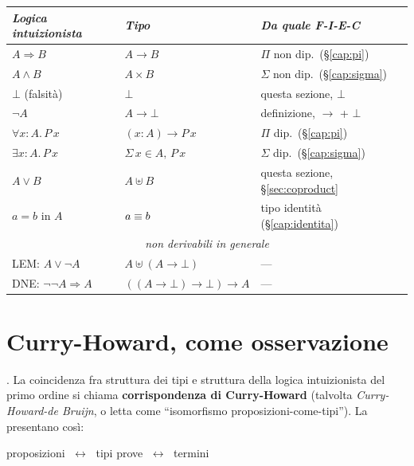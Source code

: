 \begin{center}
\renewcommand{\arraystretch}{1.2}
\begin{tabular}{lll}
\toprule
\textit{Logica intuizionista} & \textit{Tipo} & \textit{Da quale F-I-E-C} \\
\midrule
$A \Rightarrow B$       & $A \to B$              & $\Pi$ non dip.\ (\S\ref{cap:pi}) \\
$A \wedge B$            & $A \times B$           & $\Sigma$ non dip.\ (\S\ref{cap:sigma}) \\
$\bot$ (falsit\`a)      & $\bot$                 & questa sezione, $\bot$ \\
$\neg A$                & $A \to \bot$           & definizione, $\to$ + $\bot$ \\
$\forall x : A.\,P\,x$  & $(x : A) \to P\,x$     & $\Pi$ dip.\ (\S\ref{cap:pi}) \\
$\exists x : A.\,P\,x$  & $\Sigma\,x \in A,\,P\,x$ & $\Sigma$ dip.\ (\S\ref{cap:sigma}) \\
$A \vee B$              & $A \uplus B$           & questa sezione, \S\ref{sec:coproduct} \\
$a = b$ in $A$          & $a \equiv b$        & tipo identit\`a (\S\ref{cap:identita}) \\
\midrule
\multicolumn{3}{c}{\textit{non derivabili in generale}} \\
\midrule
LEM: $A \vee \neg A$    & $A \uplus (A \to \bot)$ & --- \\
DNE: $\neg\neg A \Rightarrow A$ & $((A \to \bot) \to \bot) \to A$ & --- \\
\bottomrule
\end{tabular}
\end{center}

\section*{Curry-Howard, come osservazione}

. La coincidenza fra struttura dei tipi e struttura della logica intuizionista del primo ordine si chiama \textbf{corrispondenza di Curry-Howard} (talvolta \emph{Curry-Howard-de Bruijn}, o letta come ``isomorfismo proposizioni-come-tipi''). La presentano cos\`i:

\medskip
\begin{center}
proposizioni $\;\longleftrightarrow\;$ tipi \qquad prove $\;\longleftrightarrow\;$ termini
\end{center}
\medskip

